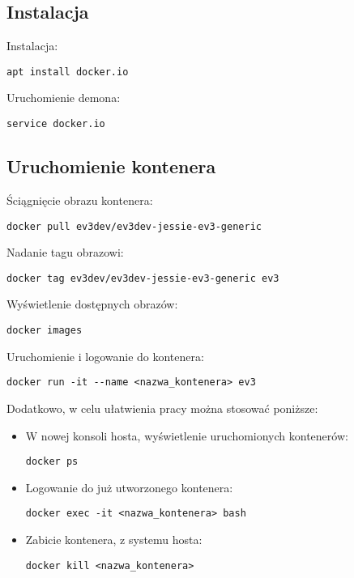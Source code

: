 \documentclass{article}
\begin{document}
\subsection{Instalacja}
Instalacja: 
\begin{lstlisting}
apt install docker.io
\end{lstlisting}
Uruchomienie demona: 
\begin{lstlisting}
service docker.io
\end{lstlisting}


\subsection{Uruchomienie kontenera}
Ściągnięcie obrazu kontenera\cite{ev3}: 
\begin{lstlisting}
docker pull ev3dev/ev3dev-jessie-ev3-generic
\end{lstlisting}
Nadanie tagu obrazowi: 
\begin{lstlisting}
docker tag ev3dev/ev3dev-jessie-ev3-generic ev3
\end{lstlisting}
Wyświetlenie dostępnych obrazów: 
\begin{lstlisting}
docker images
\end{lstlisting}
Uruchomienie i logowanie do kontenera: 
\begin{lstlisting}
docker run -it --name <nazwa_kontenera> ev3
\end{lstlisting}
Dodatkowo, w celu ułatwienia pracy można stosować poniższe:
\begin{itemize}
\item W nowej konsoli hosta, wyświetlenie uruchomionych kontenerów: 
\begin{lstlisting}
docker ps
\end{lstlisting}
\item Logowanie do już utworzonego kontenera: 
\begin{lstlisting}
docker exec -it <nazwa_kontenera> bash
\end{lstlisting}
\item Zabicie kontenera, z systemu hosta: 
\begin{lstlisting}
docker kill <nazwa_kontenera>
\end{lstlisting}
\end{itemize}
\end{document}
